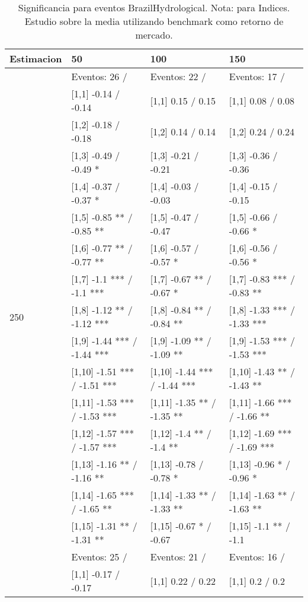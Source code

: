 \begin{table}

\caption{Significancia para eventos BrazilHydrological. Nota: para Indices. Estudio sobre la media utilizando benchmark como retorno de mercado.}
\centering
\begin{tabular}[t]{llll}
\toprule
Estimacion & 50 & 100 & 150\\
\midrule
 & Eventos:  26 / & Eventos:  22 / & Eventos:  17 /\\
 & {}[1,1] -0.14  / -0.14 & {}[1,1] 0.15  / 0.15 & {}[1,1] 0.08  / 0.08\\
 & {}[1,2] -0.18  / -0.18 & {}[1,2] 0.14  / 0.14 & {}[1,2] 0.24  / 0.24\\
 & {}[1,3] -0.49  / -0.49 * & {}[1,3] -0.21  / -0.21 & {}[1,3] -0.36  / -0.36\\
 & {}[1,4] -0.37  / -0.37 * & {}[1,4] -0.03  / -0.03 & {}[1,4] -0.15  / -0.15\\
\addlinespace
 & {}[1,5] -0.85 ** / -0.85 ** & {}[1,5] -0.47  / -0.47 & {}[1,5] -0.66  / -0.66 *\\
 & {}[1,6] -0.77 ** / -0.77 ** & {}[1,6] -0.57  / -0.57 * & {}[1,6] -0.56  / -0.56 *\\
 & {}[1,7] -1.1 *** / -1.1 *** & {}[1,7] -0.67 ** / -0.67 * & {}[1,7] -0.83 *** / -0.83 **\\
250 & {}[1,8] -1.12 ** / -1.12 *** & {}[1,8] -0.84 ** / -0.84 ** & {}[1,8] -1.33 *** / -1.33 ***\\
 & {}[1,9] -1.44 *** / -1.44 *** & {}[1,9] -1.09 ** / -1.09 ** & {}[1,9] -1.53 *** / -1.53 ***\\
\addlinespace
 & {}[1,10] -1.51 *** / -1.51 *** & {}[1,10] -1.44 *** / -1.44 *** & {}[1,10] -1.43 ** / -1.43 **\\
 & {}[1,11] -1.53 *** / -1.53 *** & {}[1,11] -1.35 ** / -1.35 ** & {}[1,11] -1.66 *** / -1.66 **\\
 & {}[1,12] -1.57 *** / -1.57 *** & {}[1,12] -1.4 ** / -1.4 ** & {}[1,12] -1.69 *** / -1.69 ***\\
 & {}[1,13] -1.16 ** / -1.16 ** & {}[1,13] -0.78  / -0.78 * & {}[1,13] -0.96 * / -0.96 *\\
 & {}[1,14] -1.65 *** / -1.65 ** & {}[1,14] -1.33 ** / -1.33 ** & {}[1,14] -1.63 ** / -1.63 **\\
\addlinespace
 & {}[1,15] -1.31 ** / -1.31 ** & {}[1,15] -0.67 * / -0.67 & {}[1,15] -1.1 ** / -1.1\\
 & Eventos:  25 / & Eventos:  21 / & Eventos:  16 /\\
 & {}[1,1] -0.17  / -0.17 & {}[1,1] 0.22  / 0.22 & {}[1,1] 0.2  / 0.2\\

\end{tabular}
\end{table}
